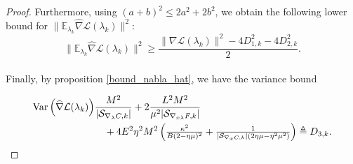 \documentclass[11pt, twoside]{report}
\begin{document}
\begin{proof}
Furthermore, using $(a+b)^2 \leq 2a^2 + 2b^2$, we obtain the following lower bound for $\|\mathbb{E}_{\lambda_k} \widehat{\nabla} \mathcal{L}(\lambda_k) \|^2$:
\begin{equation} \label{Enabhatsq_rev}
    \|\mathbb{E}_{\lambda_k} \widehat{\nabla} \mathcal{L}(\lambda_k) \|^2 \geq \frac{\|\nabla \mathcal{L}(\lambda_k)\|^2 - 4D_{1,k}^2 -4D_{2,k}^2}{2}.
\end{equation}
\\Finally, by proposition \ref{bound_nabla_hat}, we have the variance bound 

\begin{align}
\mathrm{Var}\left( \widehat{\nabla} \mathcal{L}(\lambda_k) \right) 
&\frac{M^2}{|\mathcal{S}_{\nabla_\lambda C,k}|} 
+ 2 \frac{L^2 M^2}{\mu^2|\mathcal{S}_{\nabla_{x\lambda} F,k}|} \,  \notag \\
&\quad + 4E^2\eta^2 M^2 \left( \tfrac{\kappa^2}{B (2 - \eta \mu)^2} 
+ \tfrac{1}{|\mathcal{S}_{\nabla_x C,k}|(2\eta \mu - \eta^2 \mu^2)} \right)
\triangleq D_{3,k}.
\label{varbndthm}
\end{align}



\end{proof}
\end{document}
